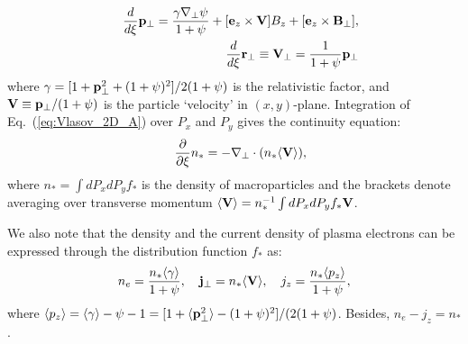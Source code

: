 \documentclass[twocolumn,showpacs,aip]{revtex4}
\begin{document}
\begin{appendix}
\begin{eqnarray}
&&\frac{d}{d\xi}{\bf{p}}_{\perp}=\frac{\gamma\nabla_{\perp}\psi}{1+\psi} +[ {\bf{e}}_z\times {\bf{V}}]B_z+[{\bf{e}}_z\times {\bf{B}}_{\perp}],
\label{eq:EoM_111}\\
&&\frac{d}{d\xi}{\bf{r}}_{\perp}\equiv {\bf{V}}_{\perp}=\frac{1}{1+\psi}{\bf{p}}_{\perp} \label{eq:EoM_112_A}
\end{eqnarray}
where  $\gamma=[{1+{\bf{p}}_{\perp}^2+(1+\psi)^2}]/{2(1+\psi)}$ is the relativistic factor, and ${\bf{V}}\equiv {\bf{p}}_{\perp}/({1+\psi})$ is the particle `velocity' in $(x,y)$-plane. Integration of  Eq.~(\ref{eq:Vlasov_2D_A}) over  $P_x$ and $P_y$ gives the  continuity equation:
\begin{eqnarray}
&&\frac{\partial}{\partial \xi}n_{*}=
-\nabla_{\perp}\cdot (n_*\langle{\bf{V}}\rangle), 
\label{eq:continuity}
\end{eqnarray}
where  $n_{*}=\int dP_xdP_y f_*$ is the density of macroparticles and  the brackets denote averaging over transverse momentum $\langle {\bf{V}}\rangle={{n}}_{*}^{-1}\int dP_xdP_y f_{*}{\bf{V}}$.

We also note that  the density and the current density of plasma electrons can be expressed through the distribution function  $f_*$ as:
 \begin{eqnarray}
n_e=\frac{n_*\langle \gamma \rangle}{1+\psi},\quad {\bf{j}}_{\perp}=n_*\langle {\bf{V}}\rangle, %
\quad j_z=\frac{n_*\langle p_z\rangle}{1+\psi},\label{eq:Jr}
\end{eqnarray}
 where $\langle p_z\rangle=\langle \gamma \rangle-\psi-1=[1+\langle {\bf{p}}_{\perp}^2\rangle-(1+\psi)^2]/(2(1+\psi)$. Besides, $n_e-j_z=n_*$. 



\end{appendix}
\end{document}
